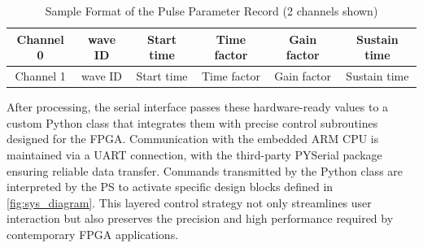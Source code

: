 \begin{table}[h]
\centering
\caption{Sample Format of the Pulse Parameter Record (2 channels shown)}
\label{table:wave_rec_table}
\begin{tabular}{|c|c|c|c|c|c|}
\hline
Channel 0 & wave ID & Start time & Time factor & Gain factor & Sustain time \\
\hline
Channel 1 & wave ID & Start time & Time factor & Gain factor & Sustain time \\
\hline
\end{tabular}
\end{table}

After processing, the serial interface passes these hardware-ready values to a custom Python class that integrates them with precise control subroutines designed for the FPGA. Communication with the embedded ARM CPU is maintained via a UART connection, with the third-party PYSerial package ensuring reliable data transfer. Commands transmitted by the Python class are interpreted by the PS to activate specific design blocks defined in \autoref{fig:sys_diagram}. This layered control strategy not only streamlines user interaction but also preserves the precision and high performance required by contemporary FPGA applications.
